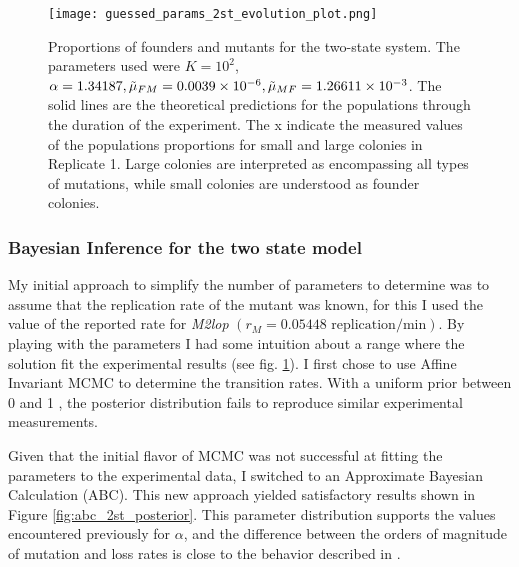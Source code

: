 \documentclass[10pt,a4paper]{scrartcl}
\begin{document}
\begin{figure}[H]
    \centering
    \texttt{[image: guessed\_params\_2st\_evolution\_plot.png]}
    \caption{Proportions of founders and mutants for the two-state system. The parameters used were $K = 10^2$, %
$\alpha = 1.34187, \Tilde{\mu}_{FM} = 0.0039\times 10^{-6}, \Tilde{\mu}_{MF} = 1.26611\times 10^{-3}$. The solid lines are the theoretical predictions for the populations through the duration of the experiment. The x indicate the measured values of the populations proportions for small and large colonies in Replicate 1. Large colonies are interpreted as encompassing all types of mutations, while small colonies are understood as founder colonies.}
    \label{fig:population_frac_2st}
\end{figure}

\subsubsection{Bayesian Inference for the two state model}

My initial approach to simplify the number of parameters to determine was to assume that the replication rate of the mutant was known, for this I used the value of the reported rate for \textit{M2lop} $(r_M = 0.05448 \text{ replication/min})$. By playing with the parameters I had some intuition about a range where the solution fit the experimental results (see fig. \ref{fig:population_frac_2st}). I first chose to use Affine Invariant MCMC to determine the transition rates. With a uniform prior between 0 and 1 , the posterior distribution fails to reproduce similar experimental measurements.

Given that the initial flavor of MCMC was not successful at fitting the parameters to the experimental data, I switched to an Approximate Bayesian Calculation (ABC). This new approach yielded satisfactory results shown in Figure \ref{fig:abc_2st_posterior}. This parameter distribution supports the values encountered previously for $\alpha$, and the difference between the orders of magnitude of mutation and loss rates is close to the behavior described in \cite{reams_duplication_2010}. 
 
\end{document}
